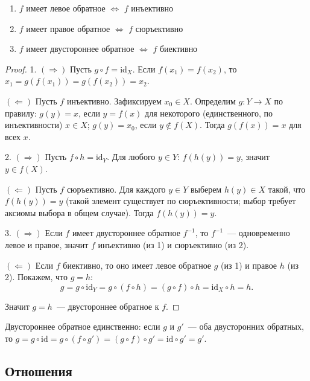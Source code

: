 \documentclass[12pt]{article}
\begin{document}
	\begin{theorem}
		\begin{enumerate}
			\item $f$ имеет левое обратное $\Leftrightarrow$ $f$ инъективно
			\item $f$ имеет правое обратное $\Leftrightarrow$ $f$ сюръективно
			\item $f$ имеет двустороннее обратное $\Leftrightarrow$ $f$ биективно
		\end{enumerate}
	\end{theorem}
	
	\begin{proof}
		1. $(\Rightarrow)$ Пусть $g \circ f = \text{id}_X$. Если $f(x_1) = f(x_2)$, то $x_1 = g(f(x_1)) = g(f(x_2)) = x_2$.
		
		$(\Leftarrow)$ Пусть $f$ инъективно. Зафиксируем $x_0 \in X$. Определим $g: Y \to X$ по правилу: $g(y) = x$, если $y = f(x)$ для некоторого (единственного, по инъективности) $x \in X$; $g(y) = x_0$, если $y \notin f(X)$. Тогда $g(f(x)) = x$ для всех $x$.
		
		2. $(\Rightarrow)$ Пусть $f \circ h = \text{id}_Y$. Для любого $y \in Y$: $f(h(y)) = y$, значит $y \in f(X)$.
		
		$(\Leftarrow)$ Пусть $f$ сюръективно. Для каждого $y \in Y$ выберем $h(y) \in X$ такой, что $f(h(y)) = y$ (такой элемент существует по сюръективности; выбор требует аксиомы выбора в общем случае). Тогда $f(h(y)) = y$.
		
		3. $(\Rightarrow)$ Если $f$ имеет двустороннее обратное $f^{-1}$, то $f^{-1}$~--- одновременно левое и правое, значит $f$ инъективно (из 1) и сюръективно (из 2).
		
		$(\Leftarrow)$ Если $f$ биективно, то оно имеет левое обратное $g$ (из 1) и правое $h$ (из 2). Покажем, что $g = h$:
		\[g = g \circ \text{id}_Y = g \circ (f \circ h) = (g \circ f) \circ h = \text{id}_X \circ h = h.\]
		
		Значит $g = h$~--- двустороннее обратное к $f$.
	\end{proof}
	
	\begin{note}
		Двустороннее обратное единственно: если $g$ и $g'$~--- оба двусторонних обратных, то $g = g \circ \text{id} = g \circ (f \circ g') = (g \circ f) \circ g' = \text{id} \circ g' = g'$.
	\end{note}
	
	\subsection{Отношения}
	
\end{document}

